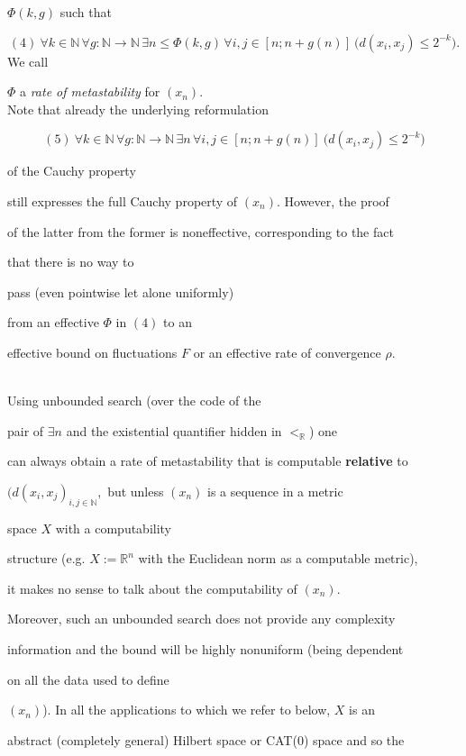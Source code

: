 \documentclass[1p]{elsarticle}
\newcommand{\RR}{\ensuremath{\mathbb{R}}}
\newcommand{\NN}{\ensuremath{\mathbb{N}}}
\theoremstyle{plain}
\theoremstyle{definition}
\theoremstyle{remark}
\theoremstyle{definition}
\begin{document}
$\Phi(k,g)$ such that 

\[ (4) \ \forall k\in\NN\,\forall g:\NN\to\NN\, \exists n\le \Phi(k,g) 

\,\forall i,j \in [n;n+g(n)]\ \big( d(x_i,x_j)\le 2^{-k}\big). \] We call 

$\Phi$ a {\it rate of metastability} for $(x_n).$ \\  

Note that already the underlying reformulation 

\[ (5) \ \forall k\in \NN\,\forall g:\NN\to\NN\, \exists n

\,\forall i,j \in [n;n+g(n)]\ \big( d(x_i,x_j)\le 2^{-k}\big) \]

of the Cauchy property 

still expresses the full Cauchy property of $(x_n).$ However, the proof 

of the latter from the former is noneffective, corresponding to the fact 

that there is no way to 

pass (even pointwise let alone uniformly) 

from an effective $\Phi$ in $(4)$ to an 

effective bound on fluctuations $F$ or an effective rate of convergence $\rho.$

\\[2mm] Using unbounded search (over the code of the 

pair of $\exists n$ and the existential quantifier hidden in $<_{\RR}$) one 

can always obtain a rate of metastability that is computable {\bf relative} to 

$(d(x_i,x_j)_{i,j\in\NN},$ but unless  $(x_n)$ is a sequence in a metric 

space $X$ with a computability 

structure (e.g. $X:=\RR^n$ with the Euclidean norm as a computable metric), 

it makes no sense to talk about the computability of $(x_n).$ 

Moreover, such an unbounded search does not provide any complexity 

information and the bound will be highly nonuniform (being dependent 

on all the data used to define 

$(x_n)$). In all the applications to which we refer to below, $X$ is an 

abstract (completely general) Hilbert space or CAT(0) space and so the 
\end{document}
